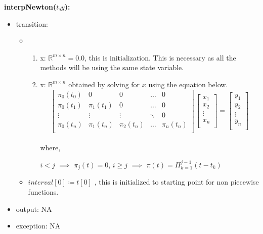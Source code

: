 \documentclass[12pt, titlepage]{article}
\begin{document}
\noindent \textbf{interpNewton($t$,$y$):}
\begin{itemize}
	\item transition: 
	\begin{itemize}
		\item 
		\begin{enumerate}
			\item x: $\mathbb{R}^{m \times n} = 0.0 $, this is initialization. 
			This is necessary as all the methods will be using the same state 
			variable.
			
			\item x: $\mathbb{R}^{m \times n}$ obtained by solving for $x$ 
			using 
			the equation below.
			\begin{equation*}
			\begin{bmatrix}
			\pi_0 (t_0) & 0           & 0            & \dots         & 0 \\
			\pi_0 (t_1) & \pi_1 (t_1) & 0            & \dots         & 0 \\
			\vdots      & \vdots      & \vdots       &\ddots         & 0 \\
			\pi_0 (t_n) & \pi_1 (t_n) & \pi_2 (t_n)  & \dots         & \pi_n 
			(t_n) \\
			\end{bmatrix}
			\begin{bmatrix}
			x_1  \\
			x_2 \\
			\vdots \\
			x_n \\
			\end{bmatrix} = 
			\begin{bmatrix}
			y_1  \\
			y_2 \\
			\vdots \\
			y_n \\
			\end{bmatrix} 
			\end{equation*}\\ 
			
			where,
			
			$i < j$ $\implies$ $\pi_j (t) = 0$, 
			$i \geq j$  $\implies$  $\pi(t) = \Pi_{k=1}^{j-1} (t - t_k)$  
			
		\end{enumerate}
		\item $interval[0] \coloneqq t[0] $ , this is initialized to 
		starting point for non piecewise functions.
	\end{itemize}	
	\item output: NA	
\item exception: NA
\end{itemize}
\end{document}
